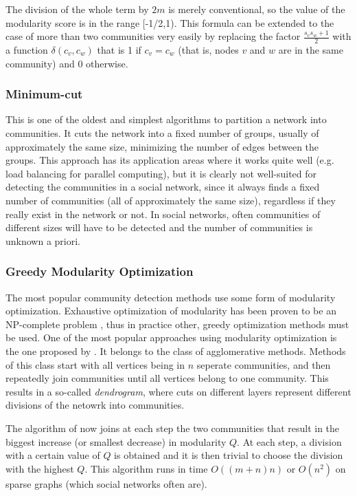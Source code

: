 The division of the whole term by $2m$ is merely conventional, so the value of the modularity score is in the range [-1/2,1). This formula can be extended to the case of more than two communities very easily by replacing the factor $\frac{s_v s_w  + 1}{2}$ with a function $\delta(c_v, c_w)$ that is 1 if $c_v = c_w$ (that is, nodes $v$ and $w$ are in the same community) and 0 otherwise.

\subsubsection{Minimum-cut}
\label{ssst:minimumcut} This is one of the oldest and simplest algorithms to partition a network into communities. It cuts the network into a fixed number of groups, usually of approximately the same size, minimizing the number of edges between the groups. This approach has its application areas where it works quite well (e.g. load balancing  for parallel computing), but it is clearly not well-suited for detecting the communities in a social network, since it always finds a fixed number of communities (all of approximately the same size), regardless if they really exist in the network or not. In social networks, often communities of different sizes will have to be detected and the number of communities is unknown a priori.

\subsubsection{Greedy Modularity Optimization}
\label{ssst:modularityoptimization} The most popular community detection methods use some form of modularity optimization. Exhaustive optimization of modularity has been proven to be an NP-complete problem \cite{Brandes_2006}, thus in practice other, greedy optimization methods must be used. One of the most popular approaches using modularity optimization is the one proposed by \cite{Clauset_2004}. It belongs to the class of agglomerative methods. Methods of this class start with all vertices being in $n$ seperate communities, and then repeatedly join communities until all vertices belong to one community. This results in a so-called \textit{dendrogram}, where cuts on different layers represent different divisions of the netowrk into communities.

The algorithm of \cite{Clauset_2004} now joins at each step the two communities that result in the biggest increase (or smallest decrease) in modularity $Q$. At each step, a division with a certain value of $Q$ is obtained and it is then trivial to choose the division with the highest $Q$. This algorithm runs in time $O((m+n)n)$ or $O(n^2)$ on sparse graphs (which social networks often are).

